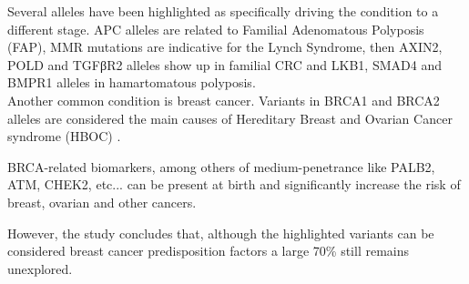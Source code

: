 Several alleles have been highlighted as specifically driving the condition to a different stage. APC alleles are related to Familial Adenomatous Polyposis (FAP), MMR mutations are indicative for the Lynch Syndrome, then AXIN2, POLD and TGFβR2 alleles show up in familial CRC and LKB1, SMAD4 and BMPR1 alleles in hamartomatous polyposis.
\\

Another common condition is breast cancer. Variants in BRCA1 and BRCA2 alleles are considered the main causes of Hereditary Breast and Ovarian Cancer syndrome (HBOC) \cite{Turnbull2008GeneticFuture}.


BRCA-related biomarkers, among others of medium-penetrance like PALB2, ATM, CHEK2, etc... can be present at birth and significantly increase the risk of breast, ovarian and other cancers.

However, the study concludes that, although the highlighted variants can be considered breast cancer predisposition factors a large 70\% still remains unexplored.